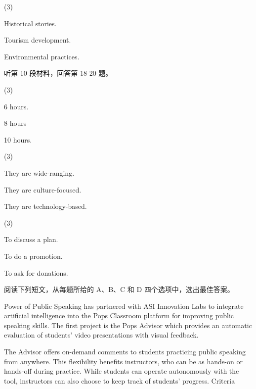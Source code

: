 \documentclass{英语试卷}
\begin{document}
\begin{choices}(3)
  \item Historical stories.
  \item Tourism development.
  \item Environmental practices.
\end{choices}
\par 听第 10 段材料，回答第 18-20 题。\par
{}
\begin{choices}(3)
  \item 6 hours.
  \item 8 hours
  \item 10 hours.
\end{choices}
\begin{choices}(3)
  \item They are wide-ranging.
  \item They are culture-focused.
  \item They are technology-based.
\end{choices}
\begin{choices}(3)
  \item To discuss a plan.
  \item To do a promotion.
  \item To ask for donations.
\end{choices}
\par 阅读下列短文，从每题所给的 A、B、C 和 D 四个选项中，选出最佳答案。\par
{}
\par Power of Public Speaking has partnered with ASI Innovation Labs to integrate artificial intelligence into the Pops Classroom platform for improving public speaking skills. The first project is the Pops Advisor which provides an automatic evaluation of students' video presentations with visual feedback.\par
\par The Advisor offers on-demand comments to students practicing public speaking from anywhere. This flexibility benefits instructors, who can be as hands-on or hands-off during practice. While students can operate autonomously with the tool, instructors can also choose to keep track of students' progress. Criteria\par
\end{document}
